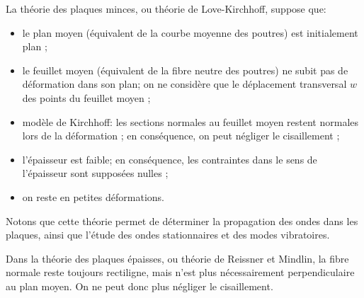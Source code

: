 \begin{histoire}
\medskip
La théorie des plaques minces, ou théorie de Love-Kirchhoff, suppose que:
\begin{itemize}
   \item le plan moyen (équivalent de la courbe moyenne des poutres) est initialement plan ;
   \item le feuillet moyen (équivalent de la fibre neutre des poutres) ne subit pas de déformation 
	dans son plan; on ne considère que le déplacement transversal $w$ des points du feuillet moyen ;
   \item modèle de Kirchhoff: 
	les sections normales au feuillet moyen restent normales lors de la 
	déformation ; en conséquence, on peut négliger le cisaillement ;
   \item l'épaisseur est faible; en conséquence, les contraintes dans le sens de l'épaisseur sont 
	supposées nulles ;
   \item on reste en petites déformations.
\end{itemize}
Notons que cette théorie permet de déterminer la propagation des ondes dans les plaques, 
ainsi que l'étude des ondes stationnaires et des modes vibratoires. 

\medskip
Dans la théorie des plaques épaisses, ou théorie de Reissner 
et Mindlin, la fibre normale reste 
toujours rectiligne, mais n'est plus nécessairement perpendiculaire au plan moyen.
On ne peut donc plus négliger le cisaillement.
\end{histoire}

